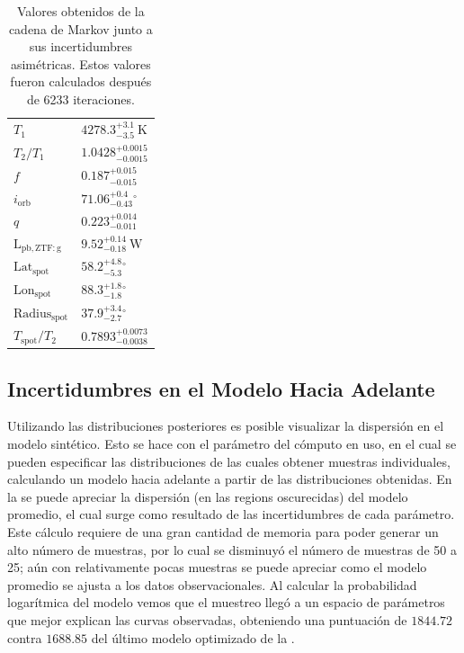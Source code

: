 {\renewcommand{\arraystretch}{1.5}%
\begin{table}[!ht]
	\centering
	\begin{tabular}{|P{3cm}|P{4cm}|}
		\hline
		                        &  \\
		\hline
		$T_1$ & $4278.3^{ +3.1 }_{ -3.5 } ~\mathrm{K}$ \\
		\hline
		$T_2 / T_1$ & $1.0428^{ +0.0015 }_{ -0.0015 } \mathrm{}$ \\
		\hline
		$f$ & $0.187^{ +0.015 }_{ -0.015 } \mathrm{}$ \\
		\hline
		$i_\mathrm{orb}$ & $71.06^{ +0.4 }_{ -0.43 } \mathrm{{}^{\circ}}$ \\
		\hline
		$q$ & $0.223^{ +0.014 }_{ -0.011 } \mathrm{}$ \\
		\hline
		$\mathrm{ L_\mathrm{ pb, ZTF:g } }$ & $9.52^{ +0.14 }_{ -0.18 } ~\mathrm{W}$ \\
		\hline
		$\mathrm{Lat}_{\mathrm{spot}}$ & $58.2^{ +4.8 }_{ -5.3 } \mathrm{{}^{\circ}}$ \\
		\hline
		$\mathrm{ Lon }_{\mathrm{spot}}$ & $88.3^{ +1.8 }_{ -1.8 } \mathrm{{}^{\circ}}$ \\
		\hline
		$\mathrm{ Radius }_{\mathrm{spot}}$ & $37.9^{ +3.4 }_{ -2.7 } \mathrm{{}^{\circ}}$ \\
		\hline
		$T_{\mathrm{spot}} / T_2$ & $0.7893^{ +0.0073 }_{ -0.0038 } \mathrm{}$ \\
		\hline
	\end{tabular}
	\caption{Valores obtenidos de la cadena de Markov junto a sus incertidumbres
	asimétricas. Estos valores fueron calculados después de 6233 iteraciones.}
	\label{tablaMcmcResultadosIncertidumbres}
\end{table}}

\subsection{Incertidumbres en el Modelo Hacia Adelante}

Utilizando las distribuciones posteriores es posible visualizar la dispersión en
el modelo sintético. Esto se hace con el parámetro  del
cómputo en uso, en el cual se pueden especificar las distribuciones de las cuales
obtener muestras individuales, calculando un modelo hacia adelante a partir de las
distribuciones obtenidas. En la  se
puede apreciar la dispersión (en las regions oscurecidas) del modelo promedio,
el cual surge como resultado de las incertidumbres de cada parámetro. Este
cálculo requiere de una gran cantidad de memoria para poder generar un alto
número de muestras, por lo cual se disminuyó el número de muestras de 50 a 25;
aún con relativamente pocas muestras se puede apreciar como el modelo promedio
se ajusta a los datos observacionales. Al calcular la probabilidad logarítmica
del modelo vemos que el muestreo llegó a un espacio de parámetros que mejor
explican las curvas observadas, obteniendo una puntuación de $1844.72$ contra
$1688.85$ del último modelo optimizado de la
.

